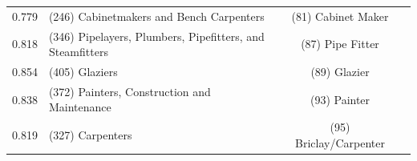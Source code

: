 \begin{table}[htpb]
\begin{tabular}{llcc}
 0.779  & (246) Cabinetmakers and Bench Carpenters             &(81) Cabinet Maker\\[.5em]
 0.818 &  (346) Pipelayers, Plumbers, Pipefitters, and Steamfitters &(87) Pipe Fitter\\[.5em]
 0.854 &  (405) Glaziers &(89) Glazier\\[.5em]
 
 0.838 & (372) Painters, Construction and Maintenance &(93) Painter\\[.5em]
 0.819 & (327) Carpenters &(95) Briclay/Carpenter\\[.5em]

\hline
\end{tabular}
\end{table}




